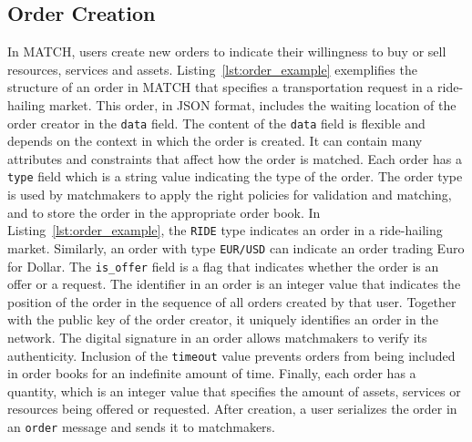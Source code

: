\subsection{Order Creation}
\label{sec:order_creation}
In MATCH, users create new orders to indicate their willingness to buy or sell resources, services and assets.
Listing~\ref{lst:order_example} exemplifies the structure of an order in MATCH that specifies a transportation request in a ride-hailing market.
This order, in JSON format, includes the waiting location of the order creator in the \texttt{data} field.
The content of the \texttt{data} field is flexible and depends on the context in which the order is created.
It can contain many attributes and constraints that affect how the order is matched.
Each order has a \texttt{type} field which is a string value indicating the type of the order.
The order type is used by matchmakers to apply the right policies for validation and matching, and to store the order in the appropriate order book.
In Listing~\ref{lst:order_example}, the \texttt{RIDE} type indicates an order in a ride-hailing market.
Similarly, an order with type \texttt{EUR/USD} can indicate an order trading Euro for Dollar.
The \texttt{is\_offer} field is a flag that indicates whether the order is an offer or a request.
The identifier in an order is an integer value that indicates the position of the order in the sequence of all orders created by that user.
Together with the public key of the order creator, it uniquely identifies an order in the network.
The digital signature in an order allows matchmakers to verify its authenticity.
Inclusion of the \texttt{timeout} value prevents orders from being included in order books for an indefinite amount of time.
Finally, each order has a quantity, which is an integer value that specifies the amount of assets, services or resources being offered or requested.
After creation, a user serializes the order in an \texttt{order} message and sends it to matchmakers.

